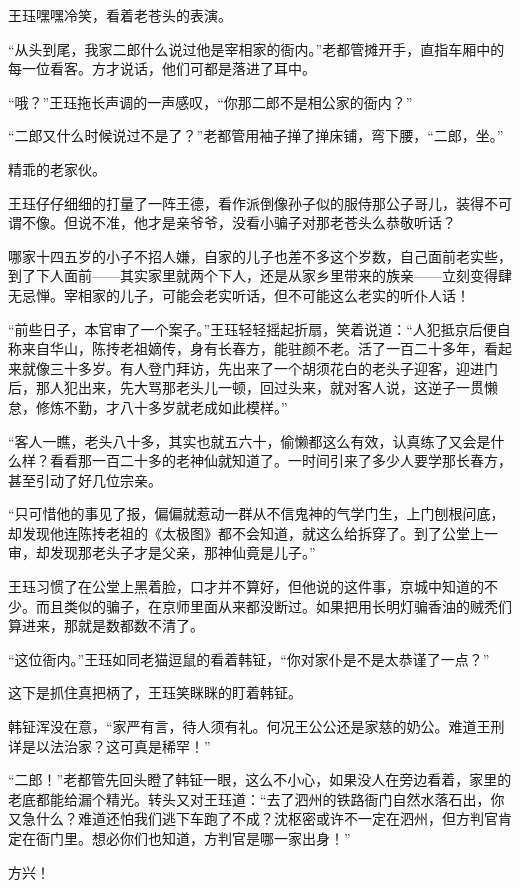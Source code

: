 王珏嘿嘿冷笑，看着老苍头的表演。

“从头到尾，我家二郎什么说过他是宰相家的衙内。”老都管摊开手，直指车厢中的每一位看客。方才说话，他们可都是落进了耳中。

“哦？”王珏拖长声调的一声感叹，“你那二郎不是相公家的衙内？”

“二郎又什么时候说过不是了？”老都管用袖子掸了掸床铺，弯下腰，“二郎，坐。”

精乖的老家伙。

王珏仔仔细细的打量了一阵王德，看作派倒像孙子似的服侍那公子哥儿，装得不可谓不像。但说不准，他才是亲爷爷，没看小骗子对那老苍头么恭敬听话？

哪家十四五岁的小子不招人嫌，自家的儿子也差不多这个岁数，自己面前老实些，到了下人面前——其实家里就两个下人，还是从家乡里带来的族亲——立刻变得肆无忌惮。宰相家的儿子，可能会老实听话，但不可能这么老实的听仆人话！

“前些日子，本官审了一个案子。”王珏轻轻摇起折扇，笑着说道：“人犯抵京后便自称来自华山，陈抟老祖嫡传，身有长春方，能驻颜不老。活了一百二十多年，看起来就像三十多岁。有人登门拜访，先出来了一个胡须花白的老头子迎客，迎进门后，那人犯出来，先大骂那老头儿一顿，回过头来，就对客人说，这逆子一贯懒怠，修炼不勤，才八十多岁就老成如此模样。”

“客人一瞧，老头八十多，其实也就五六十，偷懒都这么有效，认真练了又会是什么样？看看那一百二十多的老神仙就知道了。一时间引来了多少人要学那长春方，甚至引动了好几位宗亲。

“只可惜他的事见了报，偏偏就惹动一群从不信鬼神的气学门生，上门刨根问底，却发现他连陈抟老祖的《太极图》都不会知道，就这么给拆穿了。到了公堂上一审，却发现那老头子才是父亲，那神仙竟是儿子。”

王珏习惯了在公堂上黑着脸，口才并不算好，但他说的这件事，京城中知道的不少。而且类似的骗子，在京师里面从来都没断过。如果把用长明灯骗香油的贼秃们算进来，那就是数都数不清了。

“这位衙内。”王珏如同老猫逗鼠的看着韩钲，“你对家仆是不是太恭谨了一点？”

这下是抓住真把柄了，王珏笑眯眯的盯着韩钲。

韩钲浑没在意，“家严有言，待人须有礼。何况王公公还是家慈的奶公。难道王刑详是以法治家？这可真是稀罕！”

“二郎！”老都管先回头瞪了韩钲一眼，这么不小心，如果没人在旁边看着，家里的老底都能给漏个精光。转头又对王珏道：“去了泗州的铁路衙门自然水落石出，你又急什么？难道还怕我们逃下车跑了不成？沈枢密或许不一定在泗州，但方判官肯定在衙门里。想必你们也知道，方判官是哪一家出身！”

方兴！

